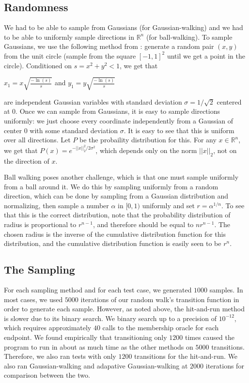 \documentclass[11pt]{article}
\begin{document}
\subsection{Randomness}

We had to be able to sample from Gaussians (for Gaussian-walking) and we had to be able to uniformly sample directions in $\mathbb{R}^n$ (for ball-walking). To sample Gaussians, we use the following method from \cite{Marsaglia}: generate a random pair $(x,y)$ from the unit circle (sample from the square $[-1,1]^2$ until we get a point in the circle). Conditioned on $s = x^2 + y^2 < 1$, we get that
\begin{center}
$\displaystyle x_1 = x\sqrt{\frac{-\ln(s)}{s}}$ and $\displaystyle y_1 = y\sqrt{\frac{-\ln(s)}{s}}$
\end{center}
are independent Gaussian variables with standard deviation $\sigma = 1/\sqrt{2}$ centered at $0$. Once we can sample from Gaussians, it is easy to sample directions uniformly: we just choose every coordinate independently from a Gaussian of center $0$ with some standard deviation $\sigma$. It is easy to see that this is uniform over all directions. Let $P$ be the probaility distribution for this. For any $x\in\mathbb{R}^n$, we get that $P(x) = e^{-||x||_2^2 / 2\sigma^2}$, which depends only on the norm $||x||_2$, not on the direction of $x$.

Ball walking poses another challenge, which is that one must sample uniformly from a ball around it. We do this by sampling uniformly from a random direction, which can be done by sampling from a Gaussian distribution and normalizing, then sample a number $\alpha$ in $[0,1)$ uniformly and set $r = \alpha^{1/n}$. To see that this is the correct distribution, note that the probability distribution of radius is proportional to $r^{n-1}$, and therefore should be equal to $nr^{n-1}$. The chosen radius is the inverse of the cumulative distribution function for this distribution, and the cumulative distribution function is easily seen to be $r^n$.

\subsection{The Sampling}

For each sampling method and for each test case, we generated $1000$ samples. In most cases, we used $5000$ iterations of our random walk's transition function in order to generate each sample. However, as noted above, the hit-and-run method is slower due to its binary search. We binary search up to a precision of $10^{-12}$, which requires approximately $40$ calls to the membership oracle for each endpoint. We found empirically that transitioning only $1200$ times caused the program to run in about as much time as the other methods on $5000$ transitions. Therefore, we also ran tests with only $1200$ transitions for the hit-and-run. We also ran Gaussian-walking and adapative Gaussian-walking at $2000$ iterations for comparison between the two.
\end{document}
